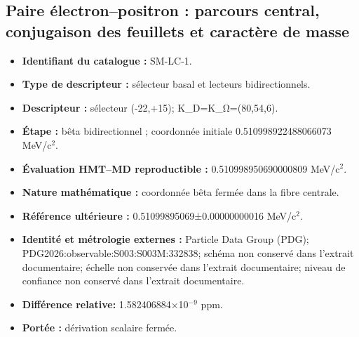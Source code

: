 \subsection{Paire électron–positron : parcours central, conjugaison des feuillets et caractère de masse}
\begin{itemize}
\item \textbf{Identifiant du catalogue :} SM-LC-1.
\item \textbf{Type de descripteur :} sélecteur basal et lecteurs bidirectionnels.
\item \textbf{Descripteur :} sélecteur (-22,+15); K\_D=\allowbreak{}K\_Ω=\allowbreak{}(80,54,6).
\item \textbf{Étape :} bêta bidirectionnel ; coordonnée initiale 0.510998\allowbreak{}922488\allowbreak{}066073 MeV/c\({}^{2}\).
\item \textbf{Évaluation HMT--MD reproductible :} 0.510998\allowbreak{}950690\allowbreak{}000809 MeV/c\({}^{2}\).
\item \textbf{Nature mathématique :} coordonnée bêta fermée dans la fibre centrale.
\item \textbf{Référence ultérieure :} 0.510998\allowbreak{}95069±\allowbreak{}0.000000\allowbreak{}00016 MeV/c\({}^{2}\).
\item \textbf{Identité et métrologie externes :} Particle Data Group (PDG); PDG2026:\allowbreak{}observable:\allowbreak{}S003:\allowbreak{}S003M:\allowbreak{}332838; schéma non conservé dans l’extrait documentaire; échelle non conservée dans l’extrait documentaire; niveau de confiance non conservé dans l’extrait documentaire.
\item \textbf{Différence relative:} 1.582406\allowbreak{}884×10\({}^{-9}\) ppm.
\item \textbf{Portée :} dérivation scalaire fermée.
\end{itemize}
